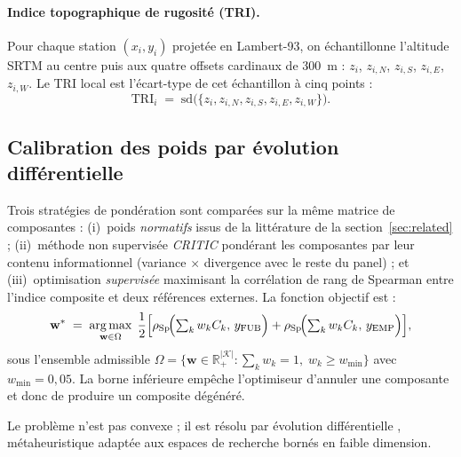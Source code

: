 \documentclass[11pt,a4paper]{article}
\DeclareMathOperator*{\argmax}{arg\,max}
\begin{document}
\paragraph{Indice topographique de rugosité (TRI).}
Pour chaque station $(x_i, y_i)$ projetée en Lambert-93, on
échantillonne l'altitude SRTM au centre puis aux quatre offsets
cardinaux de \SI{300}{\metre} : $z_i$, $z_{i,N}$, $z_{i,S}$,
$z_{i,E}$, $z_{i,W}$. Le TRI local est l'écart-type de cet
échantillon à cinq points :
\begin{equation}
    \mathrm{TRI}_i \;=\;
    \mathrm{sd}\bigl(\{z_i, z_{i,N}, z_{i,S}, z_{i,E},
                      z_{i,W}\}\bigr).
\end{equation}

\subsection{Calibration des poids par évolution différentielle}
\label{sec:calibration}

Trois stratégies de pondération sont comparées sur la même matrice
de composantes : (i)~poids \emph{normatifs} issus de la
littérature de la section~\ref{sec:related} ; (ii)~méthode
non supervisée \emph{CRITIC} \citep{Diakoulaki1995} pondérant les
composantes par leur contenu informationnel (variance
$\times$ divergence avec le reste du panel) ; et (iii)~optimisation
\emph{supervisée} maximisant la corrélation de rang de Spearman
entre l'indice composite et deux références externes. La fonction
objectif est :
\begin{equation}
    \mathbf{w}^{\ast} \;=\;
    \argmax_{\mathbf{w}\in\Omega}\;
    \frac{1}{2}\Bigl[
        \rho_{\mathrm{Sp}}\!\Bigl(\textstyle\sum_k w_k C_k,\,
            y_{\text{FUB}}\Bigr)
        +
        \rho_{\mathrm{Sp}}\!\Bigl(\textstyle\sum_k w_k C_k,\,
            y_{\text{EMP}}\Bigr)
    \Bigr],
    \label{eq:objectif}
\end{equation}
sous l'ensemble admissible
$\Omega = \{\mathbf{w}\in\mathbb{R}^{|\mathcal{K}|}_{+}\colon
\sum_k w_k = 1,\; w_k \geq w_{\min}\}$ avec $w_{\min} = 0,05$. La
borne inférieure empêche l'optimiseur d'annuler une composante et
donc de produire un composite dégénéré.

Le problème n'est pas convexe ; il est résolu par évolution
différentielle \citep{Storn1997, Price2005}, métaheuristique
adaptée aux espaces de recherche bornés en faible dimension.
\end{document}
